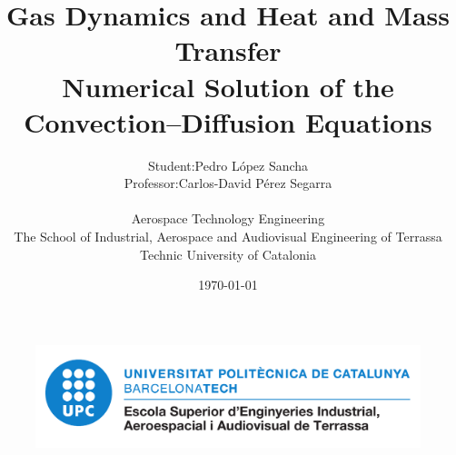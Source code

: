 
\title{
    \LARGE
    \textbf{Gas Dynamics and Heat and Mass Transfer}\\
    \textbf{\large{Numerical Solution of the Convection--Diffusion Equations}}\\
}

\author{
    \begin{tabular}{rl}
    	\vspace{4mm}
        Student: 		& Pedro López Sancha 			\\
        Professor:  	& Carlos-David Pérez Segarra 	\\
    \end{tabular}
    \vspace{1cm} \\
    Aerospace Technology Engineering \\
    \vspace{0.1cm}
    The School of Industrial, Aerospace and Audiovisual Engineering of Terrassa \\
    \vspace{0.1cm}
    Technic University of Catalonia \\
    \vspace{0.5cm} 
}

\date{\today}

\begin{titlepage}
	\vspace*{\fill}
    \begin{center}
        \thetitle
        \vspace{1cm}
        \large{\theauthor}
        \thedate
    \end{center}
	\begin{figure}[ht]
		\centering
		\includegraphics[width=0.6\linewidth]{figures/00_general/logo_eseiaat.pdf}
	\end{figure}
    \vspace*{\fill}
\end{titlepage}


